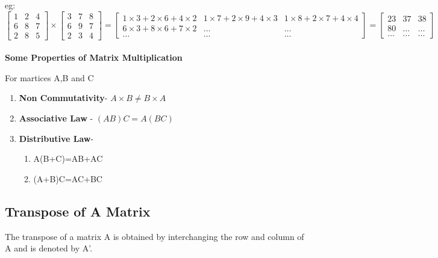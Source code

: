 \documentclass[12pt]{article}
\begin{document}
eg:$\begin{bmatrix}
    1 &2  &4\\
    6 & 8 & 7\\
    2 &8 &5
    \end{bmatrix} \times\begin{bmatrix}
        3 &7  &8\\
        6 & 9 & 7\\
        2 &3 &4
        \end{bmatrix}=\begin{bmatrix}
            1 \times 3+2 \times 6+4 \times 2 & 1 \times 7+2 \times9+ 4 \times3   & 1\times8+2\times7+4\times4\\
            6\times 3+8\times6+7\times2 & \dots & \dots\\
            \dots &\dots &\dots
            \end{bmatrix}= \begin{bmatrix}
                23 &37  &38\\
                80 & \dots & \dots\\
                \dots &\dots &\dots
                \end{bmatrix}$\\\\

                \textbf{\large Some Properties of Matrix Multiplication}
                
                For martices A,B and C
                \begin{enumerate}
                    \item \textbf{Non Commutativity}- $A \times B \not = B \times A$
                    \item \textbf{Associative Law} - $(AB)C=A(BC)$
                    \item \textbf{Distributive Law}- \begin{enumerate}
                        \item A(B+C)=AB+AC 
                        \item (A+B)C=AC+BC
                    \end{enumerate}
                \end{enumerate}




\subsection*{Transpose of A Matrix}
The transpose of a matrix A is obtained by interchanging the row and column of A and is denoted by A'.
\end{document}
